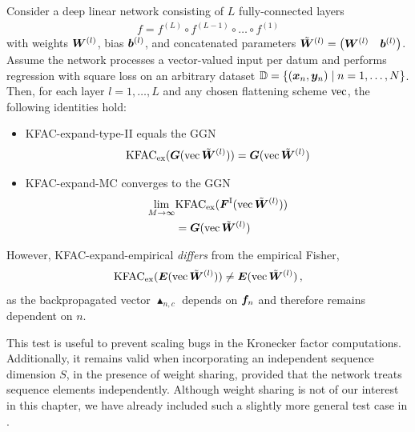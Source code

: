 \begin{test}
  Consider a deep linear network consisting of $L$ fully-connected layers
  \begin{align*}
    f = f^{(L)} \circ f^{(L-1)} \circ \ldots \circ f^{(1)}
  \end{align*}
  with weights $\mW^{(l)}$, bias $\vb^{(l)}$, and concatenated parameters $\tilde{\mW}^{(l)} = \begin{pmatrix} \mW^{(l)} & \vb^{(l)} \end{pmatrix}$.
  Assume the network processes a vector-valued input per datum and performs regression with square loss on an arbitrary dataset $\sD = \{ (\vx_n, \vy_n) \mid n = 1, \dots, N \}$.
  Then, for each layer $l=1,\dots,L$ and any chosen flattening scheme $\vec$, the following identities hold:
  \begin{itemize}[leftmargin=0.5cm]
  \item KFAC-expand-type-II equals the GGN
    \begin{align*}
      \kfac_{\text{ex}}(\mG(\vec \tilde{\mW}^{(l)}))
      =
      \mG(\vec\tilde{\mW}^{(l)})
    \end{align*}
  \item KFAC-expand-MC converges to the GGN
    \begin{align*}
      \lim_{M \to \infty}& \kfac_{\text{ex}}(\mF^{\text{I}}(\vec \tilde{\mW}^{(l)}))
      \\&=
      \mG(\vec \tilde{\mW}^{(l)})
    \end{align*}

  \end{itemize}
  However, KFAC-expand-empirical \emph{differs} from the empirical Fisher,
  \begin{align*}
    \kfac_{\text{ex}}(\mE(\vec \tilde{\mW}^{(l)}))
    \neq
    \mE(\vec \tilde{\mW}^{(l)})\,,
  \end{align*}
  as the backpropagated vector $\blacktriangle_{n,c}$ depends on $\vf_n$ and therefore remains dependent on $n$.
\end{test}

This test is useful to prevent scaling bugs in the Kronecker factor computations.
Additionally, it remains valid when incorporating an independent sequence dimension $S$, \ie in the presence of weight sharing, provided that the network treats sequence elements independently.
Although weight sharing is not of our interest in this chapter, we have already included such a slightly more general test case in .

